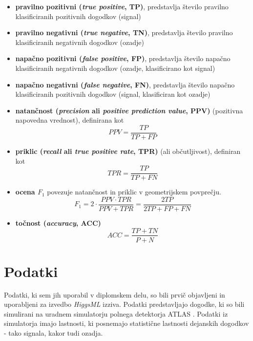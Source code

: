 \documentclass[11pt,a4paper,openany]{book}
\begin{document}
\begin{itemize}
	\item \textbf{pravilno pozitivni (\textit{true positive}, TP)}, predstavlja število pravilno klasificiranih pozitivnih dogodkov (signal)
	\item \textbf{pravilno negativni (\textit{true negative}, TN)}, predstavlja število pravilno klasificiranih negativnih dogodkov (ozadje)
	\item \textbf{napačno pozitivni (\textit{false positive}, FP)}, predstavlja število napačno klasificiranih negativnih dogodkov (ozadje, klasificirano kot signal)
	\item \textbf{napačno negativni (\textit{false negative}, FN)}, predstavlja število napačno klasificiranih pozitivnih dogodkov (signal, klasificiran kot ozadje)
	\item \textbf{natančnost (\textit{precision} ali \textit{positive prediction value}, PPV)} (pozitivna napovedna vrednost), definirana kot 
	\begin{equation}	
	PPV = \frac{TP}{TP + FP}
	\end{equation}
	\item \textbf{priklic (\textit{recall} ali \textit{true positive rate}, TPR)} (ali občutljivost), definiran kot
	\begin{equation}	
	TPR = \frac{TP}{TP + FN}
	\end{equation}
	\item \textbf{ocena $F_1$} povezuje natančnost in priklic v geometrijskem povprečju. 
	\begin{equation}
	F_1 = 2 \cdot \frac{PPV \cdot TPR}{PPV + TPR} = \frac{2TP}{2TP + FP + FN}
	\end{equation}
	\item \textbf{točnost (\textit{accuracy}, ACC)}
	\begin{equation}
	ACC = \frac{TP + TN}{P + N}
	\end{equation}
\end{itemize}

\chapter{Podatki}
\label{analiza-podatkov}
Podatki, ki sem jih uporabil v diplomskem delu, so bili prvič objavljeni in uporabljeni za izvedbo \textit{HiggsML} izziva. Podatki predstavljajo dogodke, ki so bili simulirani na uradnem simulatorju polnega detektorja ATLAS \cite{Adam-Bourdarios14}. Podatki iz simulatorja imajo lastnosti, ki posnemajo statistične lastnosti dejanskih dogodkov - tako signala, kakor tudi ozadja.
\end{document}
